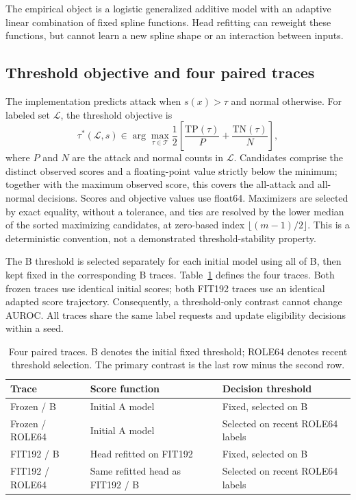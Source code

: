 The empirical object is a logistic generalized additive model with an adaptive linear combination of fixed spline functions. Head refitting can reweight these functions, but cannot learn a new spline shape or an interaction between inputs.

\subsection{Threshold objective and four paired traces}
The implementation predicts attack when $s(x)>\tau$ and normal otherwise. For labeled set $\mathcal{L}$, the threshold objective is
\begin{equation}
 \tau^{*}(\mathcal{L},s)\in\arg\max_{\tau\in\mathcal{T}}
 \frac{1}{2}\left[\frac{\mathrm{TP}(\tau)}{P}+
 \frac{\mathrm{TN}(\tau)}{N}\right],
 \label{eq:threshold}
\end{equation}
where $P$ and $N$ are the attack and normal counts in $\mathcal{L}$. Candidates comprise the distinct observed scores and a floating-point value strictly below the minimum; together with the maximum observed score, this covers the all-attack and all-normal decisions. Scores and objective values use float64. Maximizers are selected by exact equality, without a tolerance, and ties are resolved by the lower median of the sorted maximizing candidates, at zero-based index $\lfloor(m-1)/2\rfloor$. This is a deterministic convention, not a demonstrated threshold-stability property.

The B threshold is selected separately for each initial model using all of B, then kept fixed in the corresponding B traces. Table~\ref{tab:traces} defines the four traces. Both frozen traces use identical initial scores; both FIT192 traces use an identical adapted score trajectory. Consequently, a threshold-only contrast cannot change AUROC. All traces share the same label requests and update eligibility decisions within a seed.

\begin{table}[tb]
\centering\small
\caption{Four paired traces. B denotes the initial fixed threshold; ROLE64 denotes recent threshold selection. The primary contrast is the last row minus the second row.}
\label{tab:traces}
\begin{tabularx}{\linewidth}{lXX}
\toprule
Trace & Score function & Decision threshold \\
\midrule
Frozen / B & Initial A model & Fixed, selected on B \\
Frozen / ROLE64 & Initial A model & Selected on recent ROLE64 labels \\
FIT192 / B & Head refitted on FIT192 & Fixed, selected on B \\
FIT192 / ROLE64 & Same refitted head as FIT192 / B & Selected on recent ROLE64 labels \\
\bottomrule
\end{tabularx}
\end{table}

